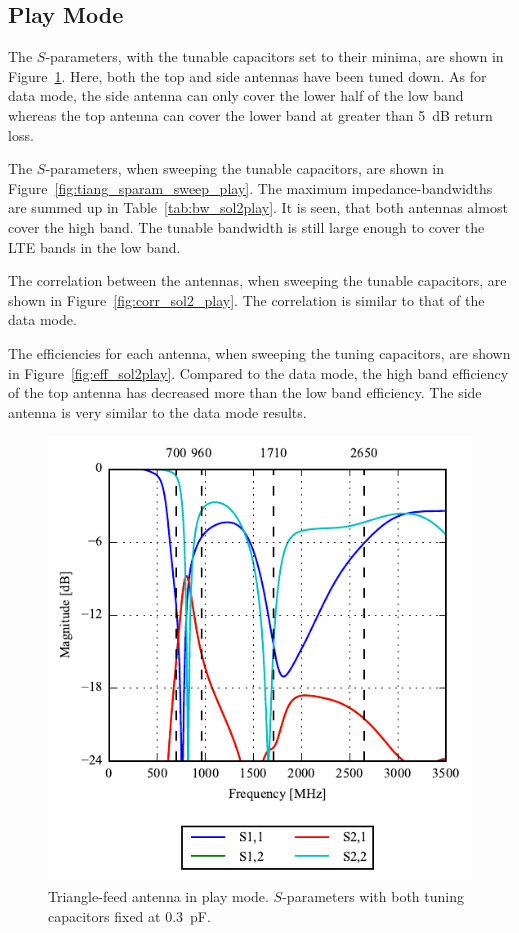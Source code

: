 \FloatBarrier
\subsection{Play Mode}
The $S$-parameters, with the tunable capacitors set to their minima, are shown in Figure~\ref{fig:triang_sparam_play}. Here, both the top and side antennas have been tuned down. As for data mode, the side antenna can only cover the lower half of the low band whereas the top antenna can cover the lower band at greater than \SI{5}{dB} return loss.

The $S$-parameters, when sweeping the tunable capacitors, are shown in Figure~\ref{fig:tiang_sparam_sweep_play}. The maximum impedance-bandwidths are summed up in Table~\ref{tab:bw_sol2play}. It is seen, that both antennas almost cover the high band. The tunable bandwidth is still large enough to cover the LTE bands in the low band.

The correlation between the antennas, when sweeping the tunable capacitors, are shown in Figure~\ref{fig:corr_sol2_play}. The correlation is similar to that of the data mode.

The efficiencies for each antenna, when sweeping the tuning capacitors, are shown in Figure~\ref{fig:eff_sol2play}. Compared to the data mode, the high band efficiency of the top antenna has decreased more than the low band efficiency. The side antenna is very similar to the data mode results.

\begin{figure}[htbp]
    \centering
    \includegraphics{img/tech_sol/trianglefeed/play_mode/sparams.pdf}
    \caption{Triangle-feed antenna in play mode. $S$-parameters with both tuning capacitors fixed at \SI{0.3}{pF}.}
    \label{fig:triang_sparam_play}
\end{figure}

